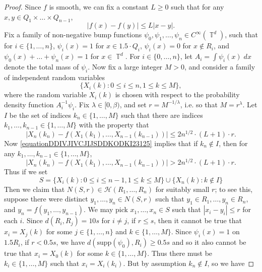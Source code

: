 \documentclass[dvipsnames,letterpaper,12pt]{article}
\numberwithin{equation}{section}
\DeclareMathOperator{\TT}{\mathbb{T}}
\numberwithin{theorem}{section}
\begin{document}
\begin{proof}
    Since $f$ is smooth, we can fix a constant $L \geq 0$ such that for any $x,y \in Q_1 \times \dots \times Q_{n-1}$,
    \begin{equation} \label{eqiatiojawoij2134141235235231}
        |f(x) - f(y)| \leq L|x - y|.
    \end{equation}
    Fix a family of non-negative bump functions $\psi_0,\psi_1,\dots,\psi_n \in C^\infty(\TT^d)$, such that for $i \in \{ 1,\dots,n \}$, $\psi_i(x) = 1$ for $x \in 1.5 \cdot Q_i$, $\psi_i(x) = 0$ for $x \not \in R_i$, and $\psi_0(x) + \dots + \psi_n(x) = 1$ for $x \in \TT^d$. For $i \in \{ 0, \dots, n \}$, let $A_i = \int \psi_i(x)\; dx$ denote the total mass of $\psi_i$. Now fix a large integer $M > 0$, and consider a family of independent random variables
    \[ \{ X_i(k) : 0 \leq i \leq n, 1 \leq k \leq M \}, \]
    where the random variable $X_i(k)$ is chosen with respect to the probability density function $A_i^{-1} \psi_i$. Fix $\lambda \in [0,\beta)$, and set $r = M^{-1/\lambda}$, i.e. so that $M = r^\lambda$. Let $I$ be the set of indices $k_n \in \{ 1, \dots, M \}$ such that there are indices $k_1,\dots,k_{n-1} \in \{ 1,\dots,M \}$ with the property that
    \begin{equation} \label{equationDDIVJIVCJIJSDDKODKI23125}
        |X_n(k_n) - f(X_1(k_1),\dots,X_{n-1}(k_{n-1}))| \leq 2 n^{1/2} \cdot (L+1) \cdot r.
    \end{equation}
    Now \eqref{equationDDIVJIVCJIJSDDKODKI23125} implies that if $k_n \not \in I$, then for any $k_1,\dots,k_{n-1} \in \{ 1, \dots, M \}$,
    \begin{equation}
        |X_n(k_n) - f(X_1(k_1),\dots,X_{n-1}(k_{n-1}))| > 2 n^{1/2} \cdot (L+1) \cdot r.
    \end{equation}
    Thus if we set
    \[ S = \{ X_i(k) : 0 \leq i \leq n-1, 1 \leq k \leq M \} \cup \{ X_n(k) : k \not \in I \} \]
    Then we claim that $N(S,r) \in \mathcal{H}(R_1,\dots,R_n)$ for suitably small $r$; to see this, suppose there were distinct $y_1,\dots,y_n \in N(S,r)$ such that $y_1 \in R_1, \dots, y_n \in R_n$, and $y_n = f(y_1,\dots,y_{n-1})$. We may pick $x_1,\dots,x_n \in S$ such that $|x_i - y_i| \leq r$ for each $i$. Since $d(R_i,R_j) = 10s$ for $i \neq j$, if $r \leq s$, then it cannot be true that $x_i = X_j(k)$ for some $j \in \{ 1, \dots, n \}$ and $k \in \{ 1, \dots, M \}$. Since $\psi_i(x) = 1$ on $1.5 R_i$, if $r < 0.5 s$, we have $d(\text{supp}(\psi_0), R_i) \geq 0.5 s$ and so it also cannot be true that $x_i = X_0(k)$ for some $k \in \{ 1, \dots, M \}$. Thus there must be $k_i \in \{ 1, \dots, M \}$ such that $x_i = X_i(k_i)$. But by assumption $k_n \not \in I$, so we have

\end{proof}
\end{document}
